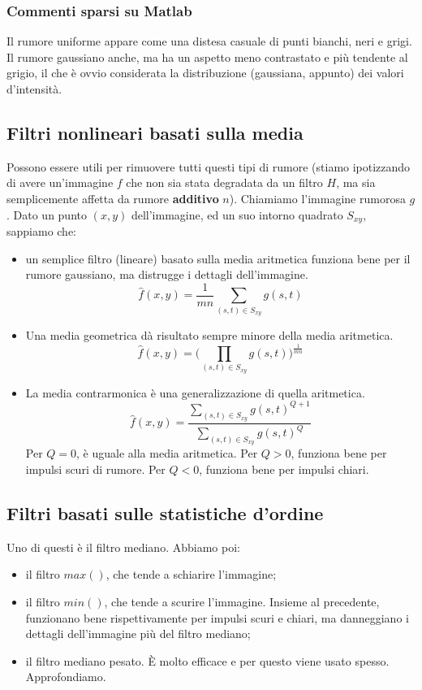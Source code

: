 \documentclass[a4paper,11pt]{article}
\begin{document}
\subsubsection{Commenti sparsi su Matlab}
Il rumore uniforme appare come una distesa casuale di punti bianchi, neri e grigi. Il rumore gaussiano anche, ma ha un aspetto meno contrastato e più tendente al grigio, il che è
ovvio considerata la distribuzione (gaussiana, appunto) dei valori d'intensità.

\subsection{Filtri nonlineari basati sulla media}
Possono essere utili per rimuovere tutti questi tipi di rumore (stiamo ipotizzando di avere un'immagine $f$ che non sia stata degradata da un filtro $H$, ma sia semplicemente affetta
da rumore \textbf{additivo} $n$). Chiamiamo l'immagine rumorosa $g$.
Dato un punto $(x,y)$ dell'immagine, ed un suo intorno quadrato $S_{xy}$, sappiamo che:
\begin{itemize}
    \item un semplice filtro (lineare) basato sulla media aritmetica funziona bene per il rumore gaussiano, ma distrugge i dettagli dell'immagine.
    \[
    \hat{f}(x,y) = \frac{1}{mn} \sum_{(s,t) \in S_{xy}} g(s,t)
    \]
    \item Una media geometrica dà risultato sempre minore della media aritmetica.
    \[
    \hat{f}(x,y) = \Biggl(\prod_{(s,t) \in S_{xy}} g(s,t)\Biggr)^{\frac{1}{mn}}
    \]
    \item La media contrarmonica è una generalizzazione di quella aritmetica.
    \[
    \hat{f}(x,y) = \frac{
    \sum_{(s,t) \in S_{xy}} g(s,t)^{Q+1}
    }{
    \sum_{(s,t) \in S_{xy}} g(s,t)^{Q}
    }
    \]
    Per $Q=0$, è uguale alla media aritmetica. Per $Q>0$, funziona bene per impulsi scuri di rumore. Per $Q<0$, funziona bene per impulsi chiari.
\end{itemize}

\subsection{Filtri basati sulle statistiche d'ordine}
Uno di questi è il filtro mediano. Abbiamo poi:
\begin{itemize}
    \item il filtro $max()$, che tende a schiarire l'immagine;
    \item il filtro $min()$, che tende a scurire l'immagine. Insieme al precedente, funzionano bene rispettivamente per impulsi scuri e chiari, ma danneggiano i dettagli dell'immagine più
    del filtro mediano;
    \item il filtro mediano pesato. È molto efficace e per questo viene usato spesso. Approfondiamo.
\end{itemize}
\end{document}
